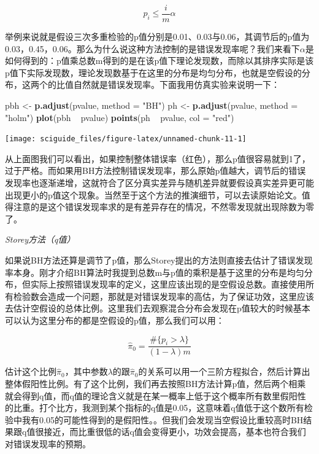 \documentclass[]{tufte-book}
\newenvironment{Shaded}{}{}
\newcommand{\DataTypeTok}[1]{\textcolor[rgb]{0.56,0.13,0.00}{#1}}
\newcommand{\KeywordTok}[1]{\textcolor[rgb]{0.00,0.44,0.13}{\textbf{#1}}}
\newcommand{\NormalTok}[1]{#1}
\newcommand{\OperatorTok}[1]{\textcolor[rgb]{0.40,0.40,0.40}{#1}}
\newcommand{\StringTok}[1]{\textcolor[rgb]{0.25,0.44,0.63}{#1}}
\begin{document}
\[
p_i \leq \frac{i}{m} \alpha
\]

举例来说就是假设三次多重检验的p值分别是0.01、0.03与0.06，其调节后的p值为0.03，0.45，0.06。那么为什么说这种方法控制的是错误发现率呢？我们来看下\(\alpha\)是如何得到的：p值乘总数m得到的是在该p值下理论发现数，而除以其排序实际是该p值下实际发现数，理论发现数基于在这里的分布是均匀分布，也就是空假设的分布，这两个的比值自然就是错误发现率。下面我用仿真实验来说明一下：

\begin{Shaded}
\begin{Highlighting}[]
\NormalTok{pbh <-}\StringTok{ }\KeywordTok{p.adjust}\NormalTok{(pvalue, }\DataTypeTok{method =} \StringTok{"BH"}\NormalTok{)}
\NormalTok{ph <-}\StringTok{ }\KeywordTok{p.adjust}\NormalTok{(pvalue, }\DataTypeTok{method =} \StringTok{"holm"}\NormalTok{)}
\KeywordTok{plot}\NormalTok{(pbh }\OperatorTok{~}\StringTok{ }\NormalTok{pvalue)}
\KeywordTok{points}\NormalTok{(ph }\OperatorTok{~}\StringTok{ }\NormalTok{pvalue, }\DataTypeTok{col =} \StringTok{"red"}\NormalTok{)}
\end{Highlighting}
\end{Shaded}

\texttt{[image: sciguide\_files/figure-latex/unnamed-chunk-11-1]}

从上面图我们可以看出，如果控制整体错误率（红色），那么p值很容易就到1了，过于严格。而如果用BH方法控制错误发现率，那么原始p值越大，调节后的错误发现率也逐渐递增，这就符合了区分真实差异与随机差异就要假设真实差异更可能出现更小的p值这个现象。当然至于这个方法的推演细节，可以去读原始论文。值得注意的是这个错误发现率求的是有差异存在的情况，不然零发现就出现除数为零了。

\emph{Storey方法（q值）}

如果说BH方法还算是调节了p值，那么Storey提出的方法则直接去估计了错误发现率本身。刚才介绍BH算法时我提到总数m与p值的乘积是基于这里的分布是均匀分布，但实际上按照错误发现率的定义，这里应该出现的是空假设总数。直接使用所有检验数会造成一个问题，那就是对错误发现率的高估，为了保证功效，这里应该去估计空假设的总体比例。这里我们去观察混合分布会发现在p值较大的时候基本可以认为这里分布的都是空假设的p值，那么我们可以用：

\[
\hat\pi_0 = \frac{\#\{p_i>\lambda\}}{(1-\lambda)m}
\]

估计这个比例\(\hat\pi_0\)，其中参数\(\lambda\)的跟\(\hat\pi_0\)的关系可以用一个三阶方程拟合，然后计算出整体假阳性比例。有了这个比例，我们再去按照BH方法计算p值，然后两个相乘就会得到q值，而q值的理论含义就是在某一概率上低于这个概率所有数里假阳性的比重。打个比方，我测到某个指标的q值是0.05，这意味着q值低于这个数所有检验中我有0.05的可能性得到的是假阳性。。但我们会发现当空假设比重较高时BH结果跟q值很接近，而比重很低的话q值会变得更小，功效会提高，基本也符合我们对错误发现率的预期。
\end{document}
